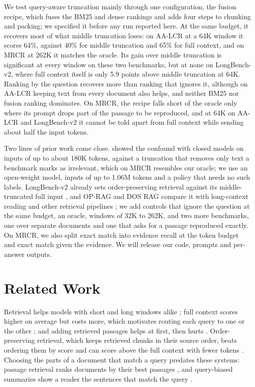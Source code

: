 \documentclass[letterpaper]{article} %
\newcommand{\recipe}{fusion recipe}
\begin{document}
We test query-aware truncation mainly through one configuration, the \recipe{}, which fuses the BM25 and dense rankings and adds four steps to chunking and packing; we specified it before any run reported here. At the same budget, it recovers most of what middle truncation loses: on AA-LCR at a 64K window it scores 64\%, against 40\% for middle truncation and 65\% for full context, and on MRCR at 262K it matches the oracle. Its gain over middle truncation is significant at every window on these two benchmarks, but at none on LongBench-v2, where full context itself is only 5.9 points above middle truncation at 64K. Ranking by the question recovers more than ranking that ignores it, although on AA-LCR keeping text from every document also helps, and neither BM25 nor fusion ranking dominates. On MRCR, the recipe falls short of the oracle only where its prompt drops part of the passage to be reproduced, and at 64K on AA-LCR and LongBench-v2 it cannot be told apart from full context while sending about half the input tokens.

Two lines of prior work come close. \citet{arjmandi2026distractor} showed the confound with closed models on inputs of up to about 180K tokens, against a truncation that removes only text a benchmark marks as irrelevant, which on MRCR resembles our oracle; we use an open-weight model, inputs of up to 1.06M tokens and a policy that needs no such labels. LongBench-v2 already sets order-preserving retrieval against its middle-truncated full input \cite{bai2025longbenchv2}, and OP-RAG and DOS RAG compare it with long-context reading and other retrieval pipelines \cite{yu2024oprag,laitenberger2025dosrag}; we add controls that ignore the question at the same budget, an oracle, windows of 32K to 262K, and two more benchmarks, one over separate documents and one that asks for a passage reproduced exactly. On MRCR, we also split exact match into evidence recall at the token budget and exact match given the evidence. We will release our code, prompts and per-answer outputs.

\section{Related Work}
Retrieval helps models with short and long windows alike \cite{xu2024retrieval}; full context scores higher on average but costs more, which motivates routing each query to one or the other \cite{li2024selfroute}; and adding retrieved passages helps at first, then hurts \cite{jin2025longcontext}. Order-preserving retrieval, which keeps retrieved chunks in their source order, beats ordering them by score \cite{yu2024oprag,laitenberger2025dosrag} and can score above the full context with fewer tokens \cite{yu2024oprag,bai2025longbenchv2}. Choosing the parts of a document that match a query predates these systems: passage retrieval ranks documents by their best passages \cite{callan1994passage,kaszkiel1997passage}, and query-biased summaries show a reader the sentences that match the query \cite{tombros1998query}.
\end{document}
